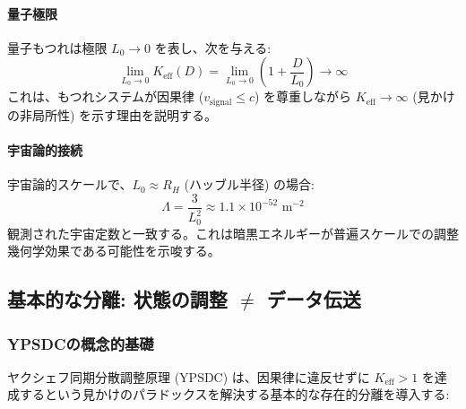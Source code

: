 \documentclass[11pt,a4paper]{article}
\begin{document}
	\paragraph{量子極限}
	量子もつれは極限 $L_0 \to 0$ を表し、次を与える:
	\begin{equation}
		\lim_{L_0 \to 0} K_{\mathrm{eff}}(D) = \lim_{L_0 \to 0} \left(1 + \frac{D}{L_0}\right) \to \infty
	\end{equation}
	これは、もつれシステムが因果律 ($v_{\text{signal}} \leq c$) を尊重しながら $K_{\mathrm{eff}} \to \infty$ (見かけの非局所性) を示す理由を説明する。
	
	\paragraph{宇宙論的接続}
	宇宙論的スケールで、$L_0 \approx R_H$ (ハッブル半径) の場合:
	\begin{equation}
		\Lambda = \frac{3}{L_0^2} \approx 1.1 \times 10^{-52} \text{ m}^{-2}
	\end{equation}
	観測された宇宙定数と一致する。これは暗黒エネルギーが普遍スケールでの調整幾何学効果である可能性を示唆する。
	
	\subsection{基本的な分離: 状態の調整 $\neq$ データ伝送}
	\label{subsec:coordination-vs-data}
	
	\subsubsection{YPSDCの概念的基礎}
	
	ヤクシェフ同期分散調整原理 (YPSDC) は、因果律に違反せずに $K_{\mathrm{eff}} > 1$ を達成するという見かけのパラドックスを解決する基本的な存在的分離を導入する:
	
\end{document}
